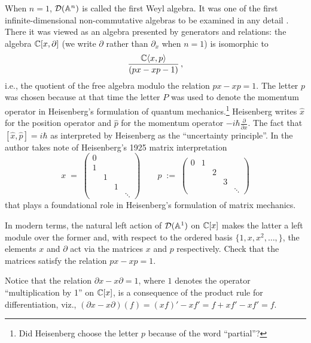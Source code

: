 \documentclass[12pt]{article}
\begin{document}
When $n=1$, $\mathcal{D}(\mathbb{A}^n)$ is called the {\sf first Weyl algebra}. It was one of the first infinite-dimensional non-commutative 
algebras to be examined
in any detail \cite[Part II]{littlewood33}. There it was viewed as an algebra presented by generators and relations: 
the algebra $\mathbb{C}[x,\partial]$ (we write $\partial$ rather than $\partial_x$ when $n=1$) is isomorphic to 
$$
\frac{\mathbb{C}\langle x,p \rangle}{(px-xp-1)}\, ,
$$
i.e., the quotient of the free algebra modulo the relation $px-xp=1$. The letter $p$ was chosen because at that time the letter $P$ was
used to denote the momentum operator in Heisenberg's formulation of quantum mechanics.\footnote{Did Heisenberg choose the letter 
$p$ because of the word ``partial''?} Heisenberg writes $\hat{x}$
for the position operator and $\hat{p}$ for the momentum operator $-i\hbar\frac{\partial}{\partial x}$. The fact that 
$[\hat{x},\hat{p}]=i\hbar$ as interpreted by Heisenberg as the ``uncertainty principle''.
In \cite[Part II]{littlewood33} the author takes note of Heisenberg's 1925 matrix interpretation
\begin{equation}
\label{matrix.opers}
x \;=\; \begin{pmatrix}
  0    &&    \\
   1   &&  \\
   & 1 && \\
   && 1 & \\
   &&& \ddots
\end{pmatrix}
\qquad 
p \; :=\; \begin{pmatrix}
  0  & 1    \\
      & & 2 \\
      &&& 3 \\  
      &&&& \ddots
\end{pmatrix}
\end{equation}
that plays a foundational role in Heisenberg's  formulation of matrix mechanics.

In modern terms, the natural left action of $\mathcal{D}(\mathbb{A}^1)$ on $\mathbb{C}[x]$ makes the latter a left module over the former and, with 
respect to the ordered basis $\{1,x,x^2,\ldots,\}$, the elements $x$ and $\partial$ act via the matrices $x$ and $p$ respectively. Check that 
the matrices satisfy the relation $px-xp=1$. 

Notice that the relation $\partial x - x \partial =1$, where $1$ denotes the operator ``multiplication by 1'' on $\mathbb{C}[x]$, is a 
consequence of the product rule for differentiation, viz., $(\partial x -x \partial)(f)=(xf)'-x f'=f +xf'-xf'=f$.
\end{document}
